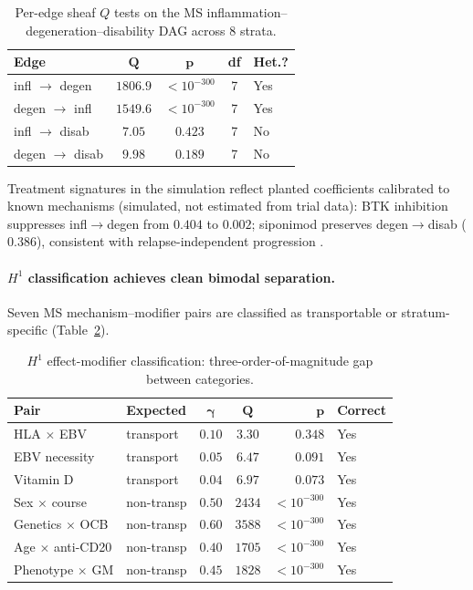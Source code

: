 \documentclass{article}
\begin{document}
\begin{table}[t]
\centering
\caption{Per-edge sheaf $Q$ tests on the MS inflammation--degeneration--disability DAG across 8 strata.}
\label{tab:dag}
\small
\begin{tabular}{@{}lcccl@{}}
\toprule
\textbf{Edge} & $\boldsymbol{Q}$ & $\boldsymbol{p}$ & \textbf{df} & \textbf{Het.?} \\
\midrule
infl $\to$ degen & $1806.9$ & $< 10^{-300}$ & 7 & Yes \\
degen $\to$ infl & $1549.6$ & $< 10^{-300}$ & 7 & Yes \\
infl $\to$ disab & $7.05$ & $0.423$ & 7 & No \\
degen $\to$ disab & $9.98$ & $0.189$ & 7 & No \\
\bottomrule
\end{tabular}
\end{table}

Treatment signatures in the simulation reflect planted coefficients calibrated to known mechanisms (simulated, not estimated from trial data): BTK inhibition suppresses infl$\to$degen from $0.404$ to $0.002$; siponimod preserves degen$\to$disab ($0.386$), consistent with relapse-independent progression \citep{kappos2018siponimod}.

\paragraph{$H^1$ classification achieves clean bimodal separation.}
Seven MS mechanism--modifier pairs are classified as transportable or stratum-specific (Table~\ref{tab:h1}).

\begin{table}[t]
\centering
\caption{$H^1$ effect-modifier classification: three-order-of-magnitude gap between categories.}
\label{tab:h1}
\small
\begin{tabular}{@{}llccrl@{}}
\toprule
\textbf{Pair} & \textbf{Expected} & $\boldsymbol{\gamma}$ & $\boldsymbol{Q}$ & $\boldsymbol{p}$ & \textbf{Correct} \\
\midrule
HLA $\times$ EBV & transport & $0.10$ & $3.30$ & $0.348$ & Yes \\
EBV necessity & transport & $0.05$ & $6.47$ & $0.091$ & Yes \\
Vitamin D & transport & $0.04$ & $6.97$ & $0.073$ & Yes \\
\midrule
Sex $\times$ course & non-transp & $0.50$ & $2434$ & $< 10^{-300}$ & Yes \\
Genetics $\times$ OCB & non-transp & $0.60$ & $3588$ & $< 10^{-300}$ & Yes \\
Age $\times$ anti-CD20 & non-transp & $0.40$ & $1705$ & $< 10^{-300}$ & Yes \\
Phenotype $\times$ GM & non-transp & $0.45$ & $1828$ & $< 10^{-300}$ & Yes \\
\bottomrule
\end{tabular}
\end{table}
\end{document}
